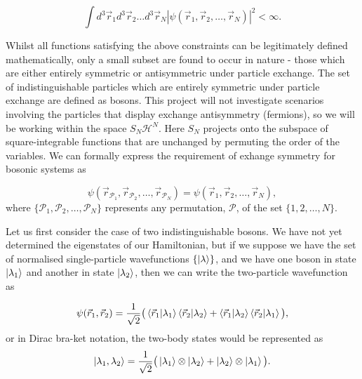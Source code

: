 \documentclass[a4paper,10pt]{article}
\begin{document}
\begin{equation*}
 \int d^3\vec{r}_1 d^3\vec{r}_2\dots d^3\vec{r}_N |\psi(\vec{r}_{1},\vec{r}_{2},\dots,\vec{r}_{N})|^2<\infty.
\end{equation*}

Whilst all functions satisfying the above constraints can be legitimately defined mathematically, only a small subset are found to occur in nature - those which are either 
entirely symmetric or antisymmetric under particle exchange. The set of indistinguishable particles which are entirely symmetric under particle exchange are defined as bosons.
This project will not investigate scenarios involving the particles that display exchange antisymmetry (fermions), so we will be working within the space $S_N\mathcal{H}^N$. Here
$S_N$ projects onto the subspace of square-integrable functions that are unchanged by permuting the order of the variables. We can formally
express the requirement of exhange symmetry for bosonic systems as \cite{Negele1988}

\begin{equation*}
 \psi({\vec{r}_{\mathcal{P}_1},\vec{r}_{\mathcal{P}_2},\dots,\vec{r}_{\mathcal{P}_N}})= \psi(\vec{r}_{1},\vec{r}_{2},\dots,\vec{r}_{N}),
\end{equation*}
where $\{\mathcal{P}_1,\mathcal{P}_2,\dots,\mathcal{P}_N  \}$ represents any permutation, $\mathcal{P}$, of the set $\{1,2,\dots,N\}$.

Let us first consider the case of two indistinguishable bosons. We have not yet determined the eigenstates 
of our Hamiltonian, but if we suppose we have the set of normalised single-particle wavefunctions $\{\ket{\lambda}\}$, and we have one boson in state $\ket{\lambda_1}$ and another
in state $\ket{\lambda_2}$, then we can write the two-particle wavefunction as

\begin{equation}
 \psi(\vec{r}_{1},\vec{r}_{2})=\frac{1}{\sqrt{2}}\big(\braket{\vec{r}_{1}|\lambda_1}\braket{\vec{r}_{2}|\lambda_2}+\braket{\vec{r}_{1}|\lambda_2}\braket{\vec{r}_{2}|\lambda_1}\big),
\end{equation}
or in Dirac bra-ket notation, the two-body states would be represented as
\begin{equation}
 \ket{\lambda_1,\lambda_2}=\frac{1}{\sqrt{2}}\big(\ket{\lambda_1}\otimes \ket{\lambda_2}+\ket{\lambda_2}\otimes\ket{\lambda_1}\big).
\end{equation}
\end{document}
